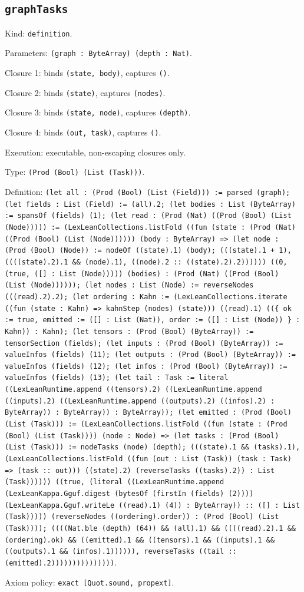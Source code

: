 \documentclass[11pt]{article}
\begin{document}
\subsection*{\texttt{graphTasks}}
\noindent Kind: \texttt{definition}.\par
\noindent Parameters: \texttt{(graph : ByteArray) (depth : Nat)}.\par
\noindent Closure 1: binds \texttt{(state, body)}, captures \texttt{()}.\par
\noindent Closure 2: binds \texttt{(state)}, captures \texttt{(nodes)}.\par
\noindent Closure 3: binds \texttt{(state, node)}, captures \texttt{(depth)}.\par
\noindent Closure 4: binds \texttt{(out, task)}, captures \texttt{()}.\par
\noindent Execution: executable, non-escaping closures only.\par
\noindent Type: \texttt{(Prod (Bool) (List (Task)))}.\par
\noindent Definition: \texttt{(let all : (Prod (Bool) (List (Field))) := parsed (graph); (let fields : List (Field) := (all).2; (let bodies : List (ByteArray) := spansOf (fields) (1); (let read : (Prod (Nat) ((Prod (Bool) (List (Node))))) := (LexLeanCollections.listFold ((fun (state : (Prod (Nat) ((Prod (Bool) (List (Node)))))) (body : ByteArray) => (let node : (Prod (Bool) (Node)) := nodeOf ((state).1) (body); (((state).1 + 1), ((((state).2).1 \&\& (node).1), ((node).2 :: ((state).2).2)))))) ((0, (true, ([] : List (Node))))) (bodies) : (Prod (Nat) ((Prod (Bool) (List (Node)))))); (let nodes : List (Node) := reverseNodes (((read).2).2); (let ordering : Kahn := (LexLeanCollections.iterate ((fun (state : Kahn) => kahnStep (nodes) (state))) ((read).1) ((\{ ok := true, emitted := ([] : List (Nat)), order := ([] : List (Node)) \} : Kahn)) : Kahn); (let tensors : (Prod (Bool) (ByteArray)) := tensorSection (fields); (let inputs : (Prod (Bool) (ByteArray)) := valueInfos (fields) (11); (let outputs : (Prod (Bool) (ByteArray)) := valueInfos (fields) (12); (let infos : (Prod (Bool) (ByteArray)) := valueInfos (fields) (13); (let tail : Task := literal ((LexLeanRuntime.append ((tensors).2) ((LexLeanRuntime.append ((inputs).2) ((LexLeanRuntime.append ((outputs).2) ((infos).2) : ByteArray)) : ByteArray)) : ByteArray)); (let emitted : (Prod (Bool) (List (Task))) := (LexLeanCollections.listFold ((fun (state : (Prod (Bool) (List (Task)))) (node : Node) => (let tasks : (Prod (Bool) (List (Task))) := nodeTasks (node) (depth); (((state).1 \&\& (tasks).1), (LexLeanCollections.listFold ((fun (out : List (Task)) (task : Task) => (task :: out))) ((state).2) (reverseTasks ((tasks).2)) : List (Task)))))) ((true, (literal ((LexLeanRuntime.append (LexLeanKappa.Gguf.digest (bytesOf (firstIn (fields) (2)))) (LexLeanKappa.Gguf.writeLe ((read).1) (4)) : ByteArray)) :: ([] : List (Task))))) (reverseNodes ((ordering).order)) : (Prod (Bool) (List (Task)))); ((((Nat.ble (depth) (64)) \&\& (all).1) \&\& ((((read).2).1 \&\& (ordering).ok) \&\& ((emitted).1 \&\& ((tensors).1 \&\& ((inputs).1 \&\& ((outputs).1 \&\& (infos).1)))))), reverseTasks ((tail :: (emitted).2)))))))))))))))}.\par
\noindent Axiom policy: \texttt{exact [Quot.sound, propext]}.\par
\end{document}
